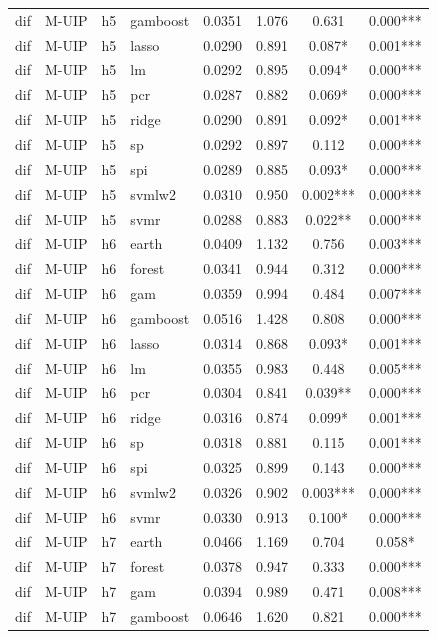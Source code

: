 \begin{ThreePartTable}
\begin{longtable}[t]{llclcccc}
dif & M-UIP & h5 & gamboost & 0.0351 & 1.076 & 0.631 & 0.000***\\
dif & M-UIP & h5 & lasso & 0.0290 & 0.891 & 0.087* & 0.001***\\
dif & M-UIP & h5 & lm & 0.0292 & 0.895 & 0.094* & 0.000***\\
dif & M-UIP & h5 & pcr & 0.0287 & 0.882 & 0.069* & 0.000***\\
dif & M-UIP & h5 & ridge & 0.0290 & 0.891 & 0.092* & 0.001***\\
dif & M-UIP & h5 & sp & 0.0292 & 0.897 & 0.112 & 0.000***\\
dif & M-UIP & h5 & spi & 0.0289 & 0.885 & 0.093* & 0.000***\\
dif & M-UIP & h5 & svmlw2 & 0.0310 & 0.950 & 0.002*** & 0.000***\\
dif & M-UIP & h5 & svmr & 0.0288 & 0.883 & 0.022** & 0.000***\\
\addlinespace
dif & M-UIP & h6 & earth & 0.0409 & 1.132 & 0.756 & 0.003***\\
dif & M-UIP & h6 & forest & 0.0341 & 0.944 & 0.312 & 0.000***\\
dif & M-UIP & h6 & gam & 0.0359 & 0.994 & 0.484 & 0.007***\\
dif & M-UIP & h6 & gamboost & 0.0516 & 1.428 & 0.808 & 0.000***\\
dif & M-UIP & h6 & lasso & 0.0314 & 0.868 & 0.093* & 0.001***\\
dif & M-UIP & h6 & lm & 0.0355 & 0.983 & 0.448 & 0.005***\\
dif & M-UIP & h6 & pcr & 0.0304 & 0.841 & 0.039** & 0.000***\\
dif & M-UIP & h6 & ridge & 0.0316 & 0.874 & 0.099* & 0.001***\\
dif & M-UIP & h6 & sp & 0.0318 & 0.881 & 0.115 & 0.001***\\
dif & M-UIP & h6 & spi & 0.0325 & 0.899 & 0.143 & 0.000***\\
dif & M-UIP & h6 & svmlw2 & 0.0326 & 0.902 & 0.003*** & 0.000***\\
dif & M-UIP & h6 & svmr & 0.0330 & 0.913 & 0.100* & 0.000***\\
\addlinespace
dif & M-UIP & h7 & earth & 0.0466 & 1.169 & 0.704 & 0.058*\\
dif & M-UIP & h7 & forest & 0.0378 & 0.947 & 0.333 & 0.000***\\
dif & M-UIP & h7 & gam & 0.0394 & 0.989 & 0.471 & 0.008***\\
dif & M-UIP & h7 & gamboost & 0.0646 & 1.620 & 0.821 & 0.000***\\

\end{longtable}
\end{ThreePartTable}
